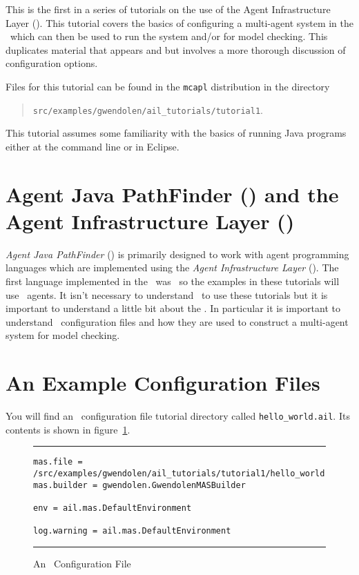 \label{tutorial:ail:configuration}
This is the first in a series of tutorials on the use of the Agent Infrastructure Layer (\ail).  This tutorial covers the basics of configuring a multi-agent system in the \ail\ which can then be used to run the system and/or for model checking.  This duplicates material that appears  and  but involves a more thorough discussion of configuration options.

Files for this tutorial can be found in the \texttt{mcapl} distribution in the directory 
\begin{quote}
\texttt{src/examples/gwendolen/ail\_tutorials/tutorial1}.
\end{quote}

This tutorial assumes some familiarity with the basics of running Java programs either at the command line or in Eclipse.

\section{Agent Java PathFinder (\ajpf) and the Agent Infrastructure Layer (\ail)}

\emph{Agent Java PathFinder} (\ajpf) is primarily designed to work with agent programming languages which are implemented using the \emph{Agent Infrastructure Layer} (\ail).  The first language implemented in the \ail\ was \gwendolen\ so  the examples in these tutorials will use \gwendolen\ agents.  It isn't necessary to understand \gwendolen\ to use these tutorials but it is important to understand a little bit about the \ail.  In particular it is important to understand \ail\ configuration files and how they are used to construct a multi-agent system for model checking.

\section{An Example Configuration Files}

You will find an \ail\ configuration file tutorial directory called \texttt{hello\_world.ail}.  Its contents is shown in figure~\ref{fig:ail_config}.

\begin{figure}[htb]
\noindent\rule{\textwidth}{1pt}
\begin{verbatim}
mas.file = /src/examples/gwendolen/ail_tutorials/tutorial1/hello_world.gwen
mas.builder = gwendolen.GwendolenMASBuilder

env = ail.mas.DefaultEnvironment

log.warning = ail.mas.DefaultEnvironment
\end{verbatim}
\rule{\textwidth}{1pt}
\caption{An \ail\ Configuration File}
\label{fig:ail_config}
\end{figure}

